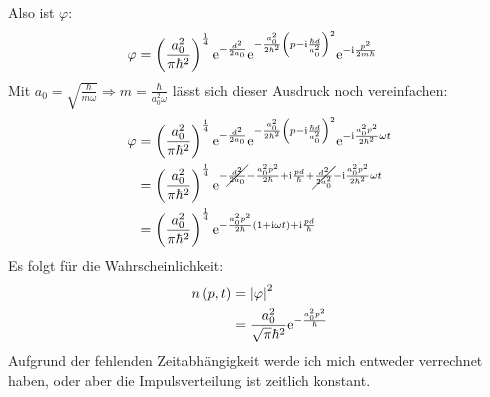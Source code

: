 \documentclass[11pt, ngerman, fleqn, DIV=15, headinclude]{scrartcl}
\begin{document}
Also ist $\varphi$:
\begin{align*}
	\varphi	&= \left( \frac{a_0^2}{\pi\hbar^2} \right)^{\frac14}\mathrm e^{-\frac{d^2}{2a_0}}\mathrm e^{-\frac{a_0^2}{2\hbar^2}\left( p-\mathrm i\frac{\hbar d}{a_0^2} \right)^2}\mathrm e^{-\mathrm i\frac{p^2}{2m\hbar}}
\end{align*}
Mit $a_0=\sqrt{\frac{\hbar}{m\omega}}\Rightarrow m=\frac{\hbar}{a_0^2\omega}$ lässt sich dieser Ausdruck noch vereinfachen:
\begin{align*}
	\varphi	&= \left( \frac{a_0^2}{\pi\hbar^2} \right)^{\frac14}\mathrm e^{-\frac{d^2}{2a_0}}\mathrm e^{-\frac{a_0^2}{2\hbar^2}\left( p-\mathrm i\frac{\hbar d}{a_0^2} \right)^2}\mathrm e^{-\mathrm i\frac{a_0^2p^2}{2\hbar^2}\omega t}\\
			&= \left( \frac{a_0^2}{\pi\hbar^2} \right)^{\frac14}\mathrm e^{-\cancel{\frac{d^2}{2a_0}}-\frac{a_0^2p^2}{2\hbar}+\mathrm i\frac{pd}{\hbar}+\cancel{\frac{d^2}{2a_0^2}}-\mathrm i\frac{a_0^2p^2}{2\hbar^2}\omega t}\\
			&= \left( \frac{a_0^2}{\pi\hbar^2} \right)^{\frac14}\mathrm e^{-\frac{a_0^2p^2}{2\hbar}\left( 1+\mathrm i\omega t \right)+\mathrm i\frac{pd}{\hbar}}\\
\end{align*}
Es folgt für die Wahrscheinlichkeit:
\begin{align*}
	n\left( p,t \right)	&= \left| \varphi \right|^2\\
				&= \frac{a_0^2}{\sqrt{\pi}\hbar^2}\mathrm e^{-\frac{a_0^2p^2}{\hbar}}\\
\end{align*}
Aufgrund der fehlenden Zeitabhängigkeit werde ich mich entweder verrechnet haben, oder aber die Impulsverteilung ist zeitlich konstant.

\subsection{}
\end{document}
